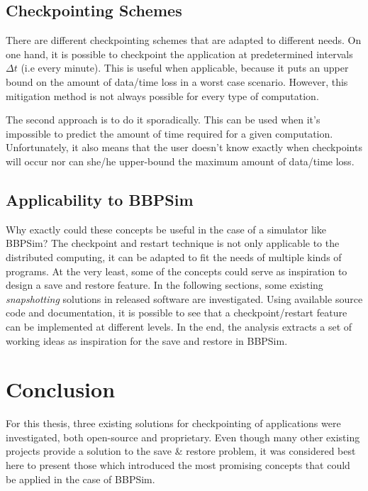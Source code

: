 {\subsection*{Checkpointing Schemes}
There are different checkpointing schemes that are adapted to different needs. On one hand, it is possible to checkpoint the application at predetermined intervals $\Delta t$ (i.e every minute). This is useful when applicable, because it puts an upper bound on the amount of data/time loss in a worst case scenario. However, this mitigation method is not always possible for every type of computation. 

The second approach is to do it sporadically. This can be used when it's impossible to predict the amount of time required for a given computation. Unfortunately, it also means that the user doesn't know exactly when checkpoints will occur nor can she/he upper-bound the maximum amount of data/time loss.

\subsection*{Applicability to BBPSim}
Why exactly could these concepts be useful in the case of a simulator like BBPSim? The checkpoint and restart technique is not only applicable to the distributed computing, it can be adapted to fit the needs of multiple kinds of programs. At the very least, some of the concepts could serve as inspiration to design a save and restore feature. In the following sections, some existing \textit{snapshotting} solutions in released software are investigated. Using available source code and documentation, it is possible to see that a checkpoint/restart feature can be implemented at different levels. In the end, the analysis extracts a set of working ideas as inspiration for the save and restore in BBPSim.





\section{Conclusion}
For this thesis, three existing solutions for checkpointing of applications were investigated, both open-source and proprietary. Even though many other existing projects provide a solution to the save \& restore problem, it was considered best here to present those which introduced the most promising concepts that could be applied in the case of \gls{BBPSim}. 

}
